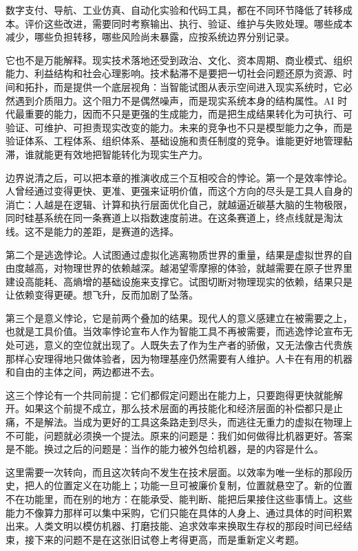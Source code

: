 数字支付、导航、工业仿真、自动化实验和代码工具，都在不同环节降低了转移成本。评价这些改进，需要同时考察输出、执行、验证、维护与失败处理。哪些成本减少，哪些负担转移，哪些风险尚未暴露，应按系统边界分别记录。

它也不是万能解释。现实技术落地还受到政治、文化、资本周期、商业模式、组织能力、利益结构和社会心理影响。技术黏滞不是要把一切社会问题还原为资源、时间和拓扑，而是提供一个底层视角：当智能试图从表示空间进入现实系统时，它必然遇到介质阻力。这个阻力不是偶然噪声，而是现实系统本身的结构属性。AI 时代最重要的能力，因而不只是更强的生成能力，而是把生成结果转化为可执行、可验证、可维护、可担责现实改变的能力。未来的竞争也不只是模型能力之争，而是验证体系、工程体系、组织体系、基础设施和责任制度的竞争。谁能更好地管理黏滞，谁就能更有效地把智能转化为现实生产力。


边界说清之后，可以把本章的推演收成三个互相咬合的悖论。第一个是效率悖论。人曾经通过变得更快、更准、更强来证明价值，而这个方向的尽头是工具人自身的消亡：人越是在逻辑、计算和执行层面优化自己，就越逼近碳基大脑的生物极限，同时硅基系统在同一条赛道上以指数速度前进。在这条赛道上，终点线就是淘汰线。这不是能力的差距，是赛道的选择。

第二个是逃逸悖论。人试图通过虚拟化逃离物质世界的重量，结果是虚拟世界的自由度越高，对物理世界的依赖越深。越渴望零摩擦的体验，就越需要在原子世界里建设高能耗、高熵增的基础设施来支撑它。试图切断对物理现实的依赖，结果只是让依赖变得更硬。想飞升，反而加剧了坠落。

第三个是意义悖论，它是前两个叠加的结果。现代人的意义感建立在被需要之上，也就是工具价值。当效率悖论宣布人作为智能工具不再被需要，而逃逸悖论宣布无处可逃，意义的空位就出现了。人既失去了作为生产者的骄傲，又无法像古代贵族那样心安理得地只做体验者，因为物理基座仍然需要有人维护。人卡在有用的机器和自由的主体之间，两边都进不去。


这三个悖论有一个共同前提：它们都假定问题出在能力上，只要跑得更快就能解开。如果这个前提不成立，那么技术层面的再技能化和经济层面的补偿都只是止痛，不是解法。当成为更好的工具这条路走到尽头，而逃往无重力的虚拟在物理上不可能，问题就必须换一个提法。原来的问题是：我们如何做得比机器更好。答案是不能。换过之后的问题是：当作的能力被外包给机器，是的内容是什么。

这里需要一次转向，而且这次转向不发生在技术层面。以效率为唯一坐标的那段历史，把人的位置定义在功能上；功能一旦可被廉价复制，位置就悬空了。新的位置不在功能里，而在别的地方：在能承受、能判断、能把后果接住这些事情上。这些能力不像算力那样可以集中采购，它们只能在具体的人身上、通过具体的时间积累出来。人类文明以模仿机器、打磨技能、追求效率来换取生存权的那段时间已经结束，接下来的问题不是在这张旧试卷上考得更高，而是重新定义考题。

